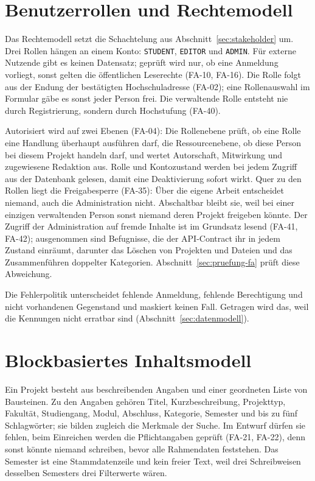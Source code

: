 \section{Benutzerrollen und Rechtemodell}
\label{sec:rechtemodell}

Das Rechtemodell setzt die Schachtelung aus Abschnitt~\ref{sec:stakeholder} um. Drei Rollen hängen an einem Konto: \texttt{STUDENT}, \texttt{EDITOR} und \texttt{ADMIN}. Für externe Nutzende gibt es keinen Datensatz; geprüft wird nur, ob eine Anmeldung vorliegt, sonst gelten die öffentlichen Leserechte (FA-10, FA-16). Die Rolle folgt aus der Endung der bestätigten Hochschuladresse (FA-02); eine Rollenauswahl im Formular gäbe es sonst jeder Person frei. Die verwaltende Rolle entsteht nie durch Registrierung, sondern durch Hochstufung (FA-40).

Autorisiert wird auf zwei Ebenen (FA-04): Die Rollenebene prüft, ob eine Rolle eine Handlung überhaupt ausführen darf, die Ressourcenebene, ob diese Person bei diesem Projekt handeln darf, und wertet Autorschaft, Mitwirkung und zugewiesene Redaktion aus. Rolle und Kontozustand werden bei jedem Zugriff aus der Datenbank gelesen, damit eine Deaktivierung sofort wirkt. Quer zu den Rollen liegt die Freigabesperre (FA-35): Über die eigene Arbeit entscheidet niemand, auch die Administration nicht. Abschaltbar bleibt sie, weil bei einer einzigen verwaltenden Person sonst niemand deren Projekt freigeben könnte. Der Zugriff der Administration auf fremde Inhalte ist im Grundsatz lesend (FA-41, FA-42); ausgenommen sind Befugnisse, die der API-Contract ihr in jedem Zustand einräumt, darunter das Löschen von Projekten und Dateien und das Zusammenführen doppelter Kategorien. Abschnitt~\ref{sec:pruefung-fa} prüft diese Abweichung.

Die Fehlerpolitik unterscheidet fehlende Anmeldung, fehlende Berechtigung und nicht vorhandenen Gegenstand und maskiert keinen Fall. Getragen wird das, weil die Kennungen nicht erratbar sind (Abschnitt~\ref{sec:datenmodell}).

\section{Blockbasiertes Inhaltsmodell}
\label{sec:inhaltsmodell}

Ein Projekt besteht aus beschreibenden Angaben und einer geordneten Liste von Bausteinen. Zu den Angaben gehören Titel, Kurzbeschreibung, Projekttyp, Fakultät, Studiengang, Modul, Abschluss, Kategorie, Semester und bis zu fünf Schlagwörter; sie bilden zugleich die Merkmale der Suche. Im Entwurf dürfen sie fehlen, beim Einreichen werden die Pflichtangaben geprüft (FA-21, FA-22), denn sonst könnte niemand schreiben, bevor alle Rahmendaten feststehen. Das Semester ist eine Stammdatenzeile und kein freier Text, weil drei Schreibweisen desselben Semesters drei Filterwerte wären.

